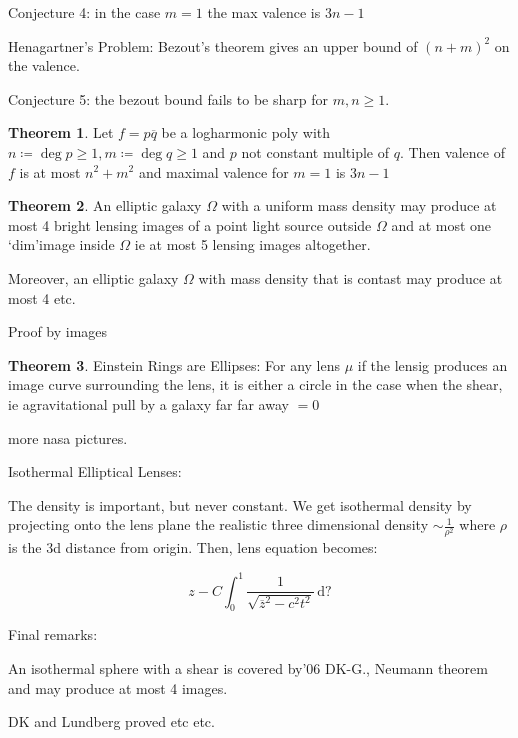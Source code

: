 \documentclass{article}
\theoremstyle{definition}
\newtheorem{theorem}{Theorem}
\begin{document}
Conjecture 4: in the case \(m=1\) the max valence is \(3n-1\)

Henagartner's Problem: Bezout's theorem gives an upper bound of \((n+m)^2\) on the valence.

Conjecture 5: the bezout bound fails to be sharp for \(m,n \geq 1\).

\begin{theorem}
    Let \(f = p \overline{q} \) be a logharmonic poly with \(n \coloneqq \deg p \geq 1, m \coloneqq \deg q \geq 1\) and \(p\) not constant multiple of \(q\). Then valence of \(f\) is at most \(n^2 + m^2\) and maximal valence for \(m=1\) is \(3n-1\)
\end{theorem}

\begin{theorem}
    An elliptic galaxy \(\Omega\) with a uniform mass density may produce at most 4 bright lensing images of a point light source outside \(\Omega \) and at most one `dim'image inside \(\Omega\) ie at most 5 lensing images altogether.

    Moreover, an elliptic galaxy \(\Omega \) with mass density that is contast may produce at most 4 etc.

    Proof by images
\end{theorem}

\begin{theorem}
    Einstein Rings are Ellipses: For any lens \(\mu\) if the lensig produces an image curve surrounding the lens, it is either a circle in the case when the shear, ie agravitational pull by a galaxy far far away \(= 0\)

    more nasa pictures.
\end{theorem}

Isothermal Elliptical Lenses:

The density is important, but never constant. We get isothermal density by projecting onto the lens plane the realistic three dimensional density \(\sim\frac{1}{\rho^2}\) where \(\rho \) is the 3d distance from origin. Then, lens equation becomes:

\[
    z - C \int_{0}^{1} \frac{1}{\sqrt{\overline{z} ^2 - c^2 t^2} } \,\mathrm{d}?
\]

Final remarks:

An isothermal sphere with a shear is covered by'06 DK-G., Neumann theorem and may produce at most 4 images.

DK and Lundberg proved etc etc.
\end{document}
